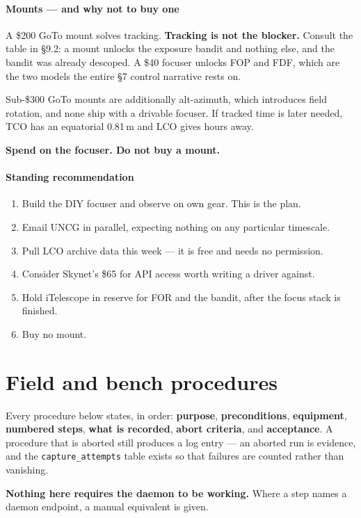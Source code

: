 \documentclass[11pt]{article}
\newcommand{\co}[1]{\texttt{\small #1}}
\begin{document}
\subsection{Mounts --- and why not to buy one}
\label{sec:mounts}

\begin{redbox}
A \$200 GoTo mount solves tracking. \textbf{Tracking is not the blocker.}
Consult the table in \S9.2: a mount unlocks the exposure bandit and nothing
else, and the bandit was already descoped. A \$40 focuser unlocks FOP and FDF,
which are the two models the entire \S7 control narrative rests on.

Sub-\$300 GoTo mounts are additionally alt-azimuth, which introduces field
rotation, and none ship with a drivable focuser. If tracked time is later
needed, TCO has an equatorial 0.81\,m and LCO gives hours away.

\textbf{Spend on the focuser. Do not buy a mount.}
\end{redbox}

\subsection{Standing recommendation}

\begin{enumerate}
\item Build the DIY focuser and observe on own gear. This is the plan.
\item Email UNCG in parallel, expecting nothing on any particular timescale.
\item Pull LCO archive data this week --- it is free and needs no permission.
\item Consider Skynet's \$65 for API access worth writing a driver against.
\item Hold iTelescope in reserve for FOR and the bandit, after the focus stack
      is finished.
\item Buy no mount.
\end{enumerate}

\part{Field and bench procedures}

\begin{keybox}
Every procedure below states, in order: \textbf{purpose}, \textbf{preconditions},
\textbf{equipment}, \textbf{numbered steps}, \textbf{what is recorded},
\textbf{abort criteria}, and \textbf{acceptance}. A procedure that is aborted
still produces a log entry --- an aborted run is evidence, and the
\co{capture\_attempts} table exists so that failures are counted rather than
vanishing.

\textbf{Nothing here requires the daemon to be working.} Where a step names a
daemon endpoint, a manual equivalent is given.
\end{keybox}
\end{document}
